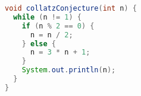 \begin{lstlisting}[language=Java,firstnumber=1]
void collatzConjecture(int n) {
  while (n != 1) {
    if (n % 2 == 0) {
      n = n / 2;
    } else {
      n = 3 * n + 1;
    }
    System.out.println(n);
  }
}
\end{lstlisting}